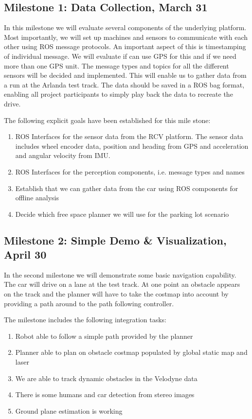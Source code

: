 \documentclass[11pt,a4paper]{article}
\begin{document}
\subsection{Milestone 1: Data Collection, March 31}
\label{milestone1}

In this milestone we will evaluate several components of the underlying platform.
Most importantly, we will set up machines and sensors to communicate with each
other using ROS message protocols. An important aspect of this is timestamping
of individual message. We will evaluate if can use GPS for this and if we need
more than one GPS unit. The message types and topics for all the different sensors
will be decided and implemented. This will enable us to gather data from a run
at the Arlanda test track. The data should be saved in a ROS bag format, enabling
all project participants to simply play back the data to recreate the drive.

The following explicit goals have been established for this mile stone:
\begin{enumerate}
\item ROS Interfaces for the sensor data from the RCV platform. The sensor data includes wheel encoder data, position and heading from GPS and acceleration and angular velocity from IMU.
\item ROS Interfaces for the perception components, i.e. message types and names
\item Establish that we can gather data from the car using ROS components for offline analysis
\item Decide which free space planner we will use for the parking lot scenario
\end{enumerate}

\subsection{Milestone 2: Simple Demo \& Visualization, April 30}
\label{milestone2}

In the second milestone we will demonstrate some basic navigation capability.
The car will drive on a lane at the test track. At one point an
obstacle appears on the track and the planner will have to take the costmap
into account by providing a path around to the path following controller.

The milestone includes the following integration tasks:
\begin{enumerate}
\item Robot able to follow a simple path provided by the planner
\item Planner able to plan on obstacle costmap populated by global static map and laser
\item We are able to track dynamic obstacles in the Velodyne data
\item There is some humans and car detection from stereo images
\item Ground plane estimation is working
\end{enumerate}
\end{document}
